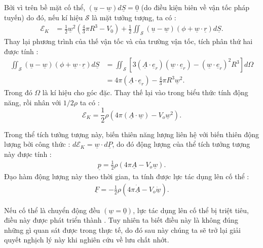 \documentclass[CO_LUU_CHAT.tex]{subfiles}
\begin{document}
Bởi vì trên bề mặt cố thể, $\left(\underline{u}-\underline{w}\right)d\underline{S}=\underline{0}$ (do điều kiện biên về vận tốc pháp tuyến) do đó, nếu kí hiệu $\mathscr{S}$ là mặt tưởng tượng, ta có :
$$
\begin{aligned}
	\mathscr{E}_K&=\frac{1}{2}\underline{w}^2\left(\frac{4}{3}\pi R^3-V_0\right)+\frac{1}{2}\iint_{\mathscr{S}}\left(\underline{u}-\underline{w}\right)\left(\phi+\underline{w}\cdot\underline{r}\right)d\underline{S}.
\end{aligned}
$$
Thay lại phương trình của thế vận tốc và của trường vận tốc, tích phân thứ hai được tính :
$$
\begin{aligned}
	\iint_{\mathscr{S}}\left(\underline{u}-\underline{w}\right)\left(\phi+\underline{w}\cdot\underline{r}\right)d\underline{S}&=\iint_{\mathscr{S}}\left[3\left(\underline{A}\cdot\underline{e}_r\right)\left(\underline{w}\cdot\underline{e}_r\right)-\left(\underline{w}\cdot\underline{e}_r\right)^2R^3\right]
	d\Omega\\
	&=4\pi\left(\underline{A}\cdot\underline{e}_r\right)-\frac{4}{3}\pi R^3\underline{w}^2.
\end{aligned}
$$
Trong đó $\Omega$ là kí hiệu cho góc đặc. Thay thế lại vào trong biểu thức tính động năng, rồi nhân với $1/2\rho$ ta có :
$$
\mathscr{E}_K=\frac{1}{2}\rho\left(4\pi\left(\underline{A}\cdot\underline{w}\right)-V_o\underline{w}^2\right).
$$

Trong thể tích tưởng tượng này, biến thiên năng lượng liên hệ với biến thiên động lượng bởi công thức : $d\mathscr{E}_K=\underline{w}\cdot d\underline{P}$, do đó động lượng của thể tích tưởng tượng này được tính :
\begin{equation}
	\begin{aligned}
		\underline{p}=\frac{1}{2}\rho\left(4\pi\underline{A}-V_o\underline{w}\right).
	\end{aligned}
\end{equation}
Đạo hàm động lượng này theo thời gian, ta tính được lực tác dụng lên cố thể :
\begin{equation}
	\begin{aligned}
		\boxed{
			\underline{F}=-\frac{1}{2}\rho\left(4\pi\dot{\underline{A}}-V_o\dot{\underline{w}}\right)
		}.
	\end{aligned}
\end{equation}

Nếu cố thể là chuyển động đều $(\underline{w}=\underline{0})$, lực tác dụng lên cố thể bị triệt tiêu, điều này được phát triển thành . Tuy nhiên ta biết điều này là không đúng những gì quan sát được trong thực tế, do đó sau này chúng ta sẽ trở lại giải quyết nghịch lý này khi nghiên cứu về lưu chất nhớt.
\end{document}
